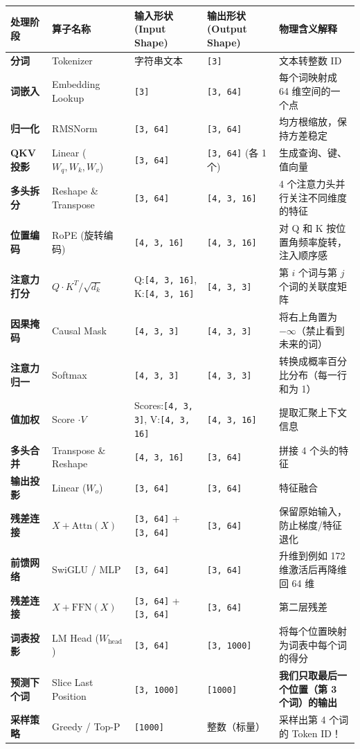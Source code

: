 \begin{center}
\small
\begin{tabularx}{\textwidth}{l X X X X }
\toprule
\textbf{处理阶段} & \textbf{算子名称} & \textbf{输入形状 (Input Shape)} & \textbf{输出形状 (Output Shape)} & \textbf{物理含义解释} \\
\midrule
\textbf{分词} & Tokenizer & 字符串文本 & \texttt{[3]} & 文本转整数 ID \\
\textbf{词嵌入} & Embedding Lookup & \texttt{[3]} & \texttt{[3, 64]} & 每个词映射成 64 维空间的一个点 \\
\textbf{归一化} & RMSNorm & \texttt{[3, 64]} & \texttt{[3, 64]} & 均方根缩放，保持方差稳定 \\
\textbf{QKV投影} & Linear ($W_q, W_k, W_v$) & \texttt{[3, 64]} & \texttt{[3, 64]} (各 1 个) & 生成查询、键、值向量 \\
\textbf{多头拆分} & Reshape \& Transpose & \texttt{[3, 64]} & \texttt{[4, 3, 16]} & 4 个注意力头并行关注不同维度的特征 \\
\textbf{位置编码} & RoPE (旋转编码) & \texttt{[4, 3, 16]} & \texttt{[4, 3, 16]} & 对 Q 和 K 按位置角频率旋转，注入顺序感 \\
\textbf{注意力打分} & $Q \cdot K^T / \sqrt{d_k}$ & Q:\texttt{[4, 3, 16]}, K:\texttt{[4, 3, 16]} & \texttt{[4, 3, 3]} & 第 $i$ 个词与第 $j$ 个词的关联度矩阵 \\
\textbf{因果掩码} & Causal Mask & \texttt{[4, 3, 3]} & \texttt{[4, 3, 3]} & 将右上角置为 $-\infty$（禁止看到未来的词） \\
\textbf{注意力归一} & Softmax & \texttt{[4, 3, 3]} & \texttt{[4, 3, 3]} & 转换成概率百分比分布（每一行和为 1） \\
\textbf{值加权} & Score $\cdot V$ & Scores:\texttt{[4, 3, 3]}, V:\texttt{[4, 3, 16]} & \texttt{[4, 3, 16]} & 提取汇聚上下文信息 \\
\textbf{多头合并} & Transpose \& Reshape & \texttt{[4, 3, 16]} & \texttt{[3, 64]} & 拼接 4 个头的特征 \\
\textbf{输出投影} & Linear ($W_o$) & \texttt{[3, 64]} & \texttt{[3, 64]} & 特征融合 \\
\textbf{残差连接} & $X + \text{Attn}(X)$ & \texttt{[3, 64]} + \texttt{[3, 64]} & \texttt{[3, 64]} & 保留原始输入，防止梯度/特征退化 \\
\textbf{前馈网络} & SwiGLU / MLP & \texttt{[3, 64]} & \texttt{[3, 64]} & 升维到例如 172 维激活后再降维回 64 维 \\
\textbf{残差连接} & $X + \text{FFN}(X)$ & \texttt{[3, 64]} + \texttt{[3, 64]} & \texttt{[3, 64]} & 第二层残差 \\
\textbf{词表投影} & LM Head ($W_{\text{head}}$) & \texttt{[3, 64]} & \texttt{[3, 1000]} & 将每个位置映射为词表中每个词的得分 \\
\textbf{预测下个词} & Slice Last Position & \texttt{[3, 1000]} & \texttt{[1000]} & \textbf{我们只取最后一个位置（第 3 个词）的输出} \\
\textbf{采样策略} & Greedy / Top-P & \texttt{[1000]} & 整数（标量） & 采样出第 4 个词的 Token ID！ \\
\bottomrule
\end{tabularx}
\end{center}

